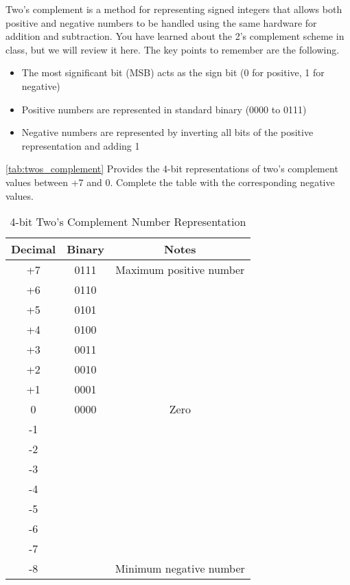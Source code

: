 \documentclass[12pt]{labmanual}
\begin{document}
Two's complement is a method for representing signed integers that allows both positive and negative numbers to be handled using the same hardware for addition and subtraction. You have learned about the 2's complement scheme in class, but we will review it here. The key points to remember are the following.
\begin{itemize}
    \item The most significant bit (MSB) acts as the sign bit (0 for positive, 1 for negative)
    \item Positive numbers are represented in standard binary (0000 to 0111)
    \item Negative numbers are represented by inverting all bits of the positive representation and adding 1
\end{itemize}
\begin{question}    
\autoref{tab:twos_complement} Provides the 4-bit representations of two's complement values between +7 and 0. Complete the table with the corresponding negative values.
\end{question}
\begin{table}[H]
    \centering
    \begin{tabular}{|c|c|c|}
    \hline
    \textbf{Decimal} & \textbf{Binary} & \textbf{Notes} \\
    \hline
    +7 & 0111 & Maximum positive number \\
    +6 & 0110 & \\
    +5 & 0101 & \\
    +4 & 0100 & \\
    +3 & 0011 & \\
    +2 & 0010 & \\
    +1 & 0001 & \\
    0 & 0000 & Zero \\
    -1 & \hspace{1em} & \\
    -2 & \hspace{1em} & \\
    -3 & \hspace{1em} & \\
    -4 & \hspace{1em} & \\
    -5 & \hspace{1em} & \\
    -6 & \hspace{1em} & \\
    -7 & \hspace{1em} & \\
    -8 & \hspace{1em} & Minimum negative number \\
    \hline
    \end{tabular}
    \caption{4-bit Two's Complement Number Representation}
    \label{tab:twos_complement}
\end{table}
\end{document}

